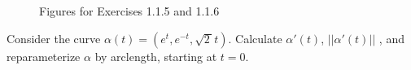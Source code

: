\documentclass[Shifrin_Solutions_Spring_2015]{subfiles}
\begin{document}
\begin{figure}[h]
\centering
{}
  \caption{Figures for Exercises 1.1.5 and 1.1.6}
\end{figure}





\begin{exercise}
Consider the curve $\alpha(t) = \left( e^t , e^{-t} , \sqrt{2\,} t \right)$. Calculate $\alpha'(t)$, $||\alpha'(t)||$ , and reparameterize $\alpha$ by arclength, starting at $t=0$.
\end{exercise}
\end{document}
